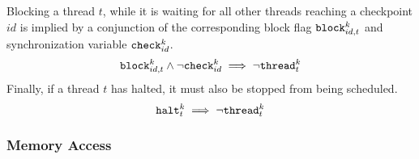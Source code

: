 Blocking a thread $t$, while it is waiting for all other threads reaching a checkpoint $id$ is implied by a conjunction of the corresponding block flag $\texttt{block}^k_{id, t}$ and synchronization variable $\texttt{check}^k_{id}$.
\[
  \texttt{block}^k_{id, t} \land \lnot \texttt{check}^k_{id} \implies \lnot \texttt{thread}^k_t
\]
Finally, if a thread $t$ has halted, it must also be stopped from being scheduled.
\[
  \texttt{halt}^k_t \implies \lnot \texttt{thread}^k_t
\]

\subsubsection{Memory Access}

\newcommand{\LOAD}{\texttt{load}}

